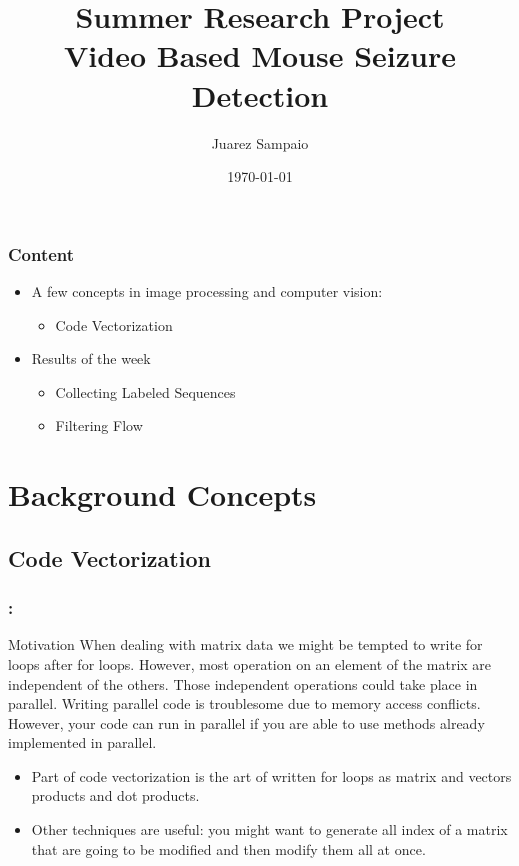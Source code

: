 \documentclass{beamer}
\title{Summer Research Project \\  Video Based Mouse Seizure Detection}
\author{Juarez Sampaio}
\institute{Rice University}
\date{\today}
\begin{document}
\begin{frame}
        \titlepage
\end{frame}

\begin{frame}[fragile]
  \frametitle{Content}
  \begin{itemize}
     \item A few concepts in image processing and computer vision:
       \begin{itemize}
           \item Code Vectorization
       \end{itemize}
     \item Results of the week
       \begin{itemize}
           \item Collecting Labeled Sequences
           \item Filtering Flow
       \end{itemize}
  \end{itemize}
\end{frame}


\section{Background Concepts}
\subsection{Code Vectorization}

\begin{frame}
  \frametitle{\secname : \subsecname}
  \begin{block}{Motivation}
    When dealing with matrix data we might be tempted to write for loops after for loops. However, most operation on an
    element of the matrix are independent of the others. Those independent operations could take place in parallel.
    Writing parallel code is troublesome due to memory access conflicts. However, your code can run in parallel if you
    are able to use methods already implemented in parallel. 
  \end{block}

  \begin{itemize}
      \item Part of code vectorization is the art of written for loops as matrix and vectors products and dot products.
      \item Other techniques are useful: you might want to generate all index of a matrix that are going to be modified
        and then modify them all at once.
  \end{itemize}
\end{frame}
\end{document}
